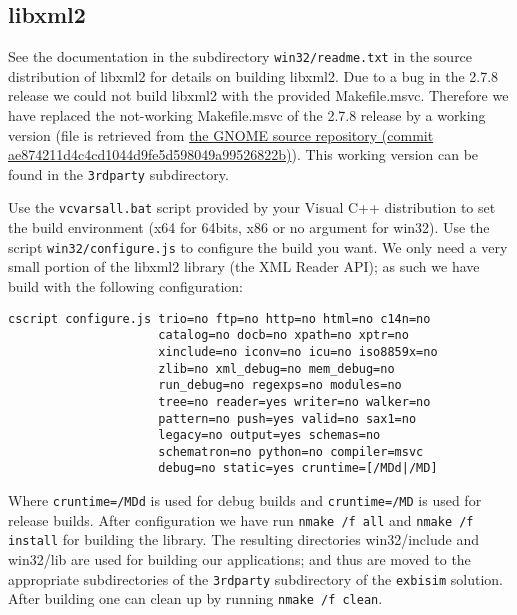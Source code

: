 \documentclass{article}
\begin{document}
\subsection{libxml2}
See the documentation in the subdirectory {\tt win32/readme.txt} in the source distribution of libxml2 for details on building libxml2. Due to a bug in the 2.7.8 release we could not build libxml2 with the provided Makefile.msvc. Therefore we have replaced the not-working Makefile.msvc of the 2.7.8 release by a working version (file is retrieved from \href{http://git.gnome.org/browse/libxml2/tree/win32/Makefile.msvc?id=ae874211d4c4cd1044d9fe5d598049a99526822b}{the GNOME source repository (commit ae874211d4c4cd1044d9fe5d598049a99526822b)}). This working version can be found in the {\tt 3rdparty} subdirectory.

Use the {\tt vcvarsall.bat} script provided by your Visual C++ distribution to set the build environment (x64 for 64bits, x86 or no argument for win32). Use the script {\tt win32/configure.js} to configure the build you want. We only need a very small portion of the libxml2 library (the XML Reader API); as such we have build with the following configuration:

\begin{verbatim}
cscript configure.js trio=no ftp=no http=no html=no c14n=no
                     catalog=no docb=no xpath=no xptr=no
                     xinclude=no iconv=no icu=no iso8859x=no
                     zlib=no xml_debug=no mem_debug=no
                     run_debug=no regexps=no modules=no
                     tree=no reader=yes writer=no walker=no
                     pattern=no push=yes valid=no sax1=no
                     legacy=no output=yes schemas=no
                     schematron=no python=no compiler=msvc
                     debug=no static=yes cruntime=[/MDd|/MD]
\end{verbatim}

Where {\tt cruntime=/MDd} is used for debug builds and {\tt cruntime=/MD} is used for release builds. After configuration we have run {\tt nmake /f all} and {\tt nmake /f install} for building the library. The resulting directories {win32/include} and {win32/lib} are used for building our applications; and thus are moved to the appropriate subdirectories of the {\tt 3rdparty} subdirectory of the {\tt exbisim} solution. After building one can clean up by running {\tt nmake /f clean}.
\end{document}
